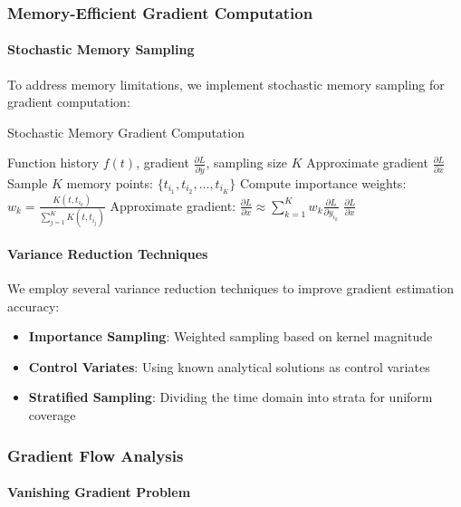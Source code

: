 \subsubsection{Memory-Efficient Gradient Computation}

\paragraph{Stochastic Memory Sampling}

To address memory limitations, we implement stochastic memory sampling for gradient computation:

\begin{algorithm}[h]
\caption{Stochastic Memory Gradient Computation}
\begin{algorithmic}[1]
\REQUIRE Function history $f(t)$, gradient $\frac{\partial L}{\partial y}$, sampling size $K$
\ENSURE Approximate gradient $\frac{\partial L}{\partial x}$
\STATE Sample $K$ memory points: $\{t_{i_1}, t_{i_2}, \ldots, t_{i_K}\}$
\STATE Compute importance weights: $w_k = \frac{K(t, t_{i_k})}{\sum_{j=1}^K K(t, t_{i_j})}$
\STATE Approximate gradient: $\frac{\partial L}{\partial x} \approx \sum_{k=1}^K w_k \frac{\partial L}{\partial y_{i_k}}$
\RETURN $\frac{\partial L}{\partial x}$
\end{algorithmic}
\end{algorithm}

\paragraph{Variance Reduction Techniques}

We employ several variance reduction techniques to improve gradient estimation accuracy:
\begin{itemize}
\item \textbf{Importance Sampling}: Weighted sampling based on kernel magnitude
\item \textbf{Control Variates}: Using known analytical solutions as control variates
\item \textbf{Stratified Sampling}: Dividing the time domain into strata for uniform coverage
\end{itemize}

\subsubsection{Gradient Flow Analysis}

\paragraph{Vanishing Gradient Problem}

